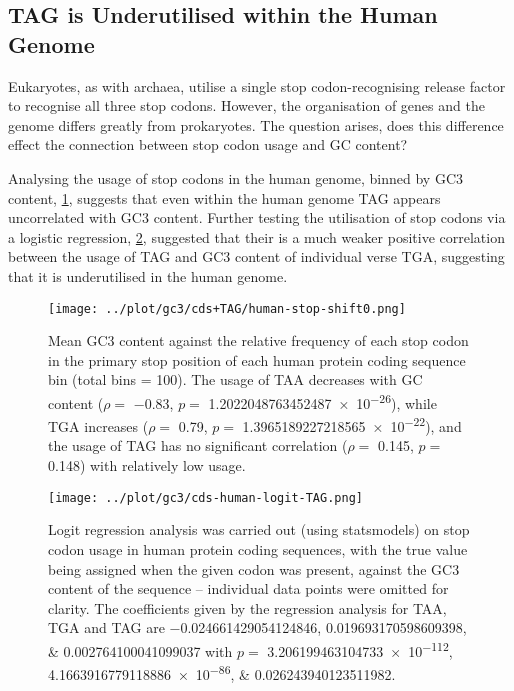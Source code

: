 \documentclass[../main.tex]{subfile}
\begin{document}
    \subsection{TAG is Underutilised within the Human Genome}
        Eukaryotes, as with archaea, utilise a single stop codon-recognising release factor to recognise all three stop codons. However, the organisation of genes and the genome differs greatly from prokaryotes. The question arises, does this difference effect the connection between stop codon usage and GC content?

        Analysing the usage of stop codons in the human genome, binned by GC3 content, \cref{fig:results/stopUsage/human/protein}, suggests that even within the human genome TAG appears uncorrelated with GC3 content.
        Further testing the utilisation of stop codons via a logistic regression, \cref{fig:results/stopUsage/human/protein/logistic}, suggested that their is a much weaker positive correlation between the usage of TAG and GC3 content of individual verse TGA, suggesting that it is underutilised in the human genome.

        \begin{figure}[H]
            \centering
            \texttt{[image: ../plot/gc3/cds+TAG/human-stop-shift0.png]}
            \caption{%
                Mean GC3 content against the relative frequency of each stop codon in the primary stop position of each human protein coding sequence bin (total bins = 100). The usage of TAA decreases with GC content ($\rho =$ \num{-0.83}, $p=$ \num[round-mode=figures, round-precision=2]{1.2022048763452487e-26}), while TGA increases ($\rho =$ \num{0.79}, $p=$ \num[round-mode=figures, round-precision=2]{1.3965189227218565e-22}), and the usage of TAG has no significant correlation ($\rho =$ \num{0.145}, $p=$ \num{0.148}) with relatively low usage.
            }
            \label{fig:results/stopUsage/human/protein}
        \end{figure}
        \begin{figure}[H]
            \centering
            \texttt{[image: ../plot/gc3/cds-human-logit-TAG.png]}
            \caption{%
                Logit regression analysis was carried out (using statsmodels) on stop codon usage in human protein coding sequences, with the true value being assigned when the given codon was present, against the GC3 content of the sequence -- individual data points were omitted for clarity.
                The coefficients given by the regression analysis for TAA, TGA and TAG are \numlist[round-mode=figures, round-precision=2]{-0.024661429054124846;0.019693170598609398;0.002764100041099037} with $p=$ \numlist[round-mode=figures, round-precision=2]{3.206199463104733e-112;4.1663916779118886e-86;0.026243940123511982}.
            }
            \label{fig:results/stopUsage/human/protein/logistic}
        \end{figure}
\end{document}
